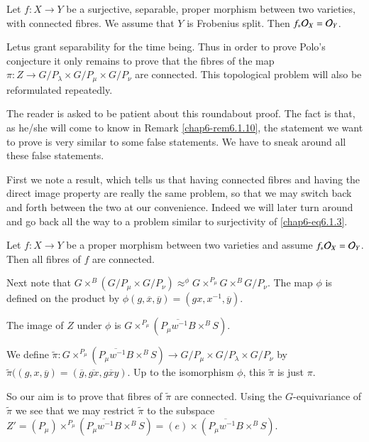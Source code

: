 \begin{proposition}\label{chap6-prop6.1.6}
Let $f:X\to Y$ be a surjective, separable, proper morphism between two
varieties, with connected fibres. We assume that $Y$ is Frobenius
split. Then $f_{\ast}\mathcal{O}_{X}=\mathcal{O}_{Y}$. 
\end{proposition}

Let\pageoriginale us\label{page60} grant separability for the time being. Thus in
order to prove Polo's conjecture it only remains to prove that the
fibres of the map $\pi:Z\to G/P_{\lambda}\times G/P_{\mu}\times
G/P_{\nu}$ are connected. This topological problem will also be
reformulated repeatedly.

The reader is asked to be patient about this roundabout proof. The
fact is that, as he/she will come to know in Remark
\ref{chap6-rem6.1.10}, the statement we want to prove is very similar
to some false statements. We have to sneak around all these false
statements. 

First we note a result, which tells us that having connected fibres
and having the direct image property are really the same problem, so
that we may switch back and forth between the two at our
convenience. Indeed we will later turn around and go back all the way
to a problem similar to surjectivity of \eqref{chap6-eq6.1.3}.

\begin{lemma}[Corollary 11.3]\label{chap6-lem6.1.7}
Let $f:X\to Y$ be a proper morphism between two varieties and assume
$f_{\ast}\mathcal{O}_{X}=\mathcal{O}_{Y}$. Then all fibres of $f$ are connected.
\end{lemma}

Next note that $G\times^{B}(G/P_{\mu}\times
G/P_{\nu}){\displaystyle{\mathop{\approx}^{\phi}}}G\times^{P_{\mu}}G\times^{B}G/P_{\nu}$. The
map $\phi$ is defined on the product by
$\phi(g,\overline{x},\overline{y})=(gx,x^{-1},\overline{y})$. 

The image of $Z$ under $\phi$ is
$G\times^{P_{\mu}}(\overline{P_{\mu}w^{-1}B}\times^{B}S)$. 

We define
$\tilde{\pi}:G\times^{P_{\mu}}(\overline{P_{\mu}w^{-1}B}\times^{B}S)\to
G/P_{\mu}\times G/P_{\lambda}\times G/P_{\nu}$ by
$\tilde{\pi}((g,x,\overline{y})=(\overline{g},\overline{gx},\overline{gxy})$. Up
to the isomorphism $\phi$, this $\tilde{\pi}$ is just $\pi$.

So our aim is to prove that fibres of $\tilde{\pi}$ are
connected. Using the $G$-equivariance of $\tilde{\pi}$ we see that we
may restrict $\tilde{\pi}$ to the subspace
$Z'=(P_{\mu})\times^{P_{\mu}}(\overline{P_{\mu}w^{-1}B}\times^{B}S)=(e)\times
(\overline{P_{\mu}w^{-1}B}\times^{B}S)$.

